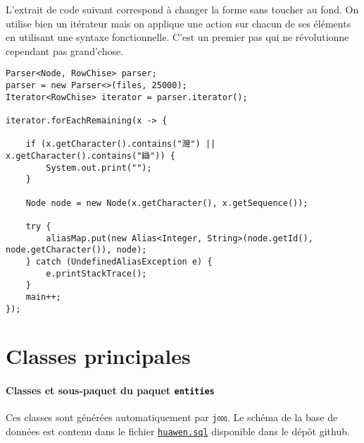 \documentclass[12pt,onecolumn]{article}
\begin{document}
L'extrait de code suivant correspond à changer la forme sans toucher au fond. On utilise bien un itérateur mais on applique une action sur chacun de ses éléments en utilisant une syntaxe fonctionnelle. C'est un premier pas qui ne révolutionne cependant pas grand'chose.
\begin{lstlisting}[caption={Premier pas de fonctionnel}]
Parser<Node, RowChise> parser;
parser = new Parser<>(files, 25000);
Iterator<RowChise> iterator = parser.iterator();

iterator.forEachRemaining(x -> {

	if (x.getCharacter().contains("灣") || x.getCharacter().contains("䜌")) {
		System.out.print("");
	}

	Node node = new Node(x.getCharacter(), x.getSequence());

	try {
		aliasMap.put(new Alias<Integer, String>(node.getId(), node.getCharacter()), node);
	} catch (UndefinedAliasException e) {
		e.printStackTrace();
	}
	main++;
});
\end{lstlisting}

\section{Classes principales}

\paragraph{Classes et sous-paquet du paquet \texttt{entities}}

Ces classes sont générées automatiquement par \texttt{j\textsc{ooq}}. Le schéma de la base de données est contenu dans le fichier \href{https://raw.githubusercontent.com/piotr2b/chinese-huawen/0e44f9d83277e5feb194dd6720a72cbb51938311/data/db/huawen.sql}{\texttt{huawen.sql}} disponible dans le dépôt github.
\end{document}
